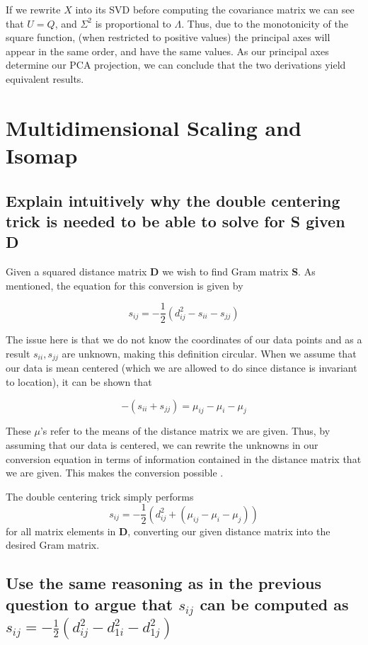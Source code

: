 \documentclass[11pt,a4paper,landscape]{article}
\begin{document}
If we rewrite $X$ into its SVD before computing the covariance matrix we can see that $U = Q$, and $\Sigma^2$ is proportional to $\Lambda$. Thus, due to the monotonicity of the square function, (when restricted to positive values) the principal axes will appear in the same order, and have the same values. As our principal axes determine our PCA projection, we can conclude that the two derivations yield equivalent results\cite{book}.

\section{Multidimensional Scaling and Isomap}

\subsection{Explain intuitively why the double centering trick is needed to be able to solve for S given D}

Given a squared distance matrix \textbf{D} we wish to find Gram matrix \textbf{S}. As mentioned, the equation for this conversion is given by

$$ s_{ij} = -\frac{1}{2}(d^{2}_{ij} - s_{ii} - s_{jj})$$

The issue here is that we do not know the coordinates of our data points and as a result $s_{ii}, s_{jj}$ are unknown, making this definition circular. When we assume that our data is mean centered (which we are allowed to do since distance is invariant to location), it can be shown that

$$ -(s_{ii} + s_{jj}) = \mu_{ij} - \mu_{i} - \mu_{j} $$

These $\mu$'s refer to the means of the distance matrix we are given. Thus, by assuming that our data is centered, we can rewrite the unknowns in our conversion equation in terms of information contained in the distance matrix that we are given. This makes the conversion possible \cite{book}.

The double centering trick simply performs $$ s_{ij} = -\frac{1}{2}(d^{2}_{ij} +( \mu_{ij} - \mu_{i} - \mu_{j}))$$ for all matrix elements in \textbf{D}, converting our given distance matrix into the desired Gram matrix.


\subsection{Use the same reasoning as in the previous question to argue that $s_{ij}$ can be computed as $s_{ij} = -\frac{1}{2}(d_{ij}^{2} - d_{1i}^{2} - d_{1j}^{2})$}
\end{document}
